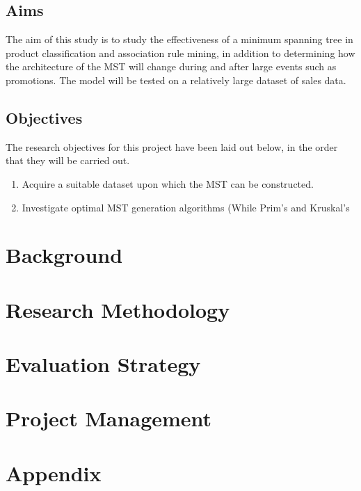\documentclass[a4paper,11pt]{article}
\newcommand{\pcite}{\parencite}
\begin{document}
\subsection{Aims}
The aim of this study is to study the effectiveness of a minimum spanning tree in product classification and association rule mining,  in addition to determining how the architecture of the MST will change during and after large events such as promotions. The model will be tested on a relatively large dataset of sales data.
\subsection{Objectives}
The research objectives for this project have been laid out below, in the order that they will be carried out.
\begin{enumerate}
\item Acquire a suitable dataset upon which the MST can be constructed.
\item Investigate optimal MST generation algorithms (While Prim's \pcite{prims} \pcite{prims_og} and Kruskal's 
\end{enumerate}

\section{Background}

\section{Research Methodology}

\section{Evaluation Strategy}

\section{Project Management}


\newpage
\printbibliography

\newpage
\section*{Appendix}
\end{document}
